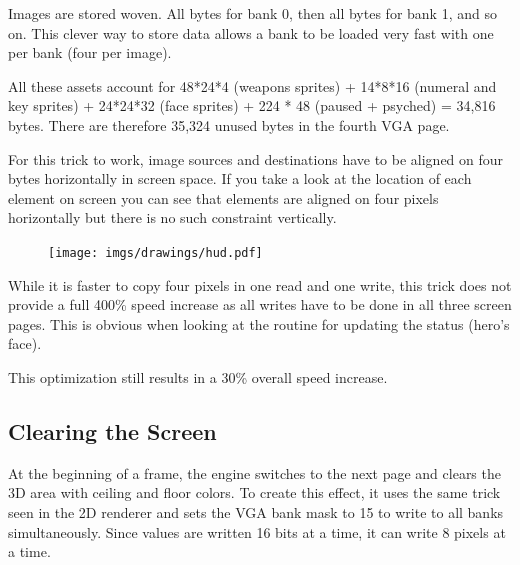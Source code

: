  Images are stored woven. All bytes for bank 0, then all bytes for bank 1, and so on. This clever way to store data allows a bank to be loaded very fast with one  per bank (four  per image).\\
\par
All these assets account for 48*24*4 (weapons sprites) + 14*8*16 (numeral and key sprites) + 24*24*32 (face sprites) + 224 * 48 (paused + psyched) = 34,816 bytes. There are therefore 35,324 unused bytes in the fourth VGA page.\\
\par
For this trick to work, image sources and destinations have to be aligned on four bytes horizontally in screen space. If you take a look at the location of each element on screen you can see that elements are aligned on four pixels horizontally but there is no such constraint vertically.
\begin{figure}[H]
  \centering
 \texttt{[image: imgs/drawings/hud.pdf]}
\end{figure}

While it is faster to copy four pixels in one read and one write, this trick does not provide a full 400\% speed increase as all writes have to be done in all three screen pages. This is obvious when looking at the routine for updating the status (hero's face).\\
\par
\begin{minipage}{\textwidth}

\end{minipage}
\par
This optimization still results in a 30\% overall speed increase.\\
\par











\subsection{Clearing the Screen}
At the beginning of a frame, the engine switches to the next page and clears the 3D area with ceiling and floor colors. To create this effect, it uses the same trick seen in the 2D renderer and sets the VGA bank mask to 15 to write to all banks simultaneously. Since values are written 16 bits at a time, it can write 8 pixels at a time.\\ 
\par
{}


